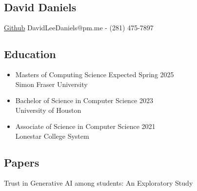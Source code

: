 \documentclass[12pt]{article}
\begin{document}
    \begin{center}
        \section*{David Daniels}
        \cite{github}\href{https://github.com/tetricz}{Github} DavidLeeDaniels@pm.me - (281) 475-7897
    \end{center}

    \subsection*{Education}
    \begin{itemize}[leftmargin=0em]
        \item[] Masters of Computing Science \hfill Expected Spring 2025 \\
        Simon Fraser University
        \item[] Bachelor of Science in Computer Science \hfill 2023 \\
        University of Houston
        \item[] Associate of Science in Computer Science \hfill 2021 \\
        Lonestar College System
    \end{itemize}

    \subsection*{Papers}

    \cite{Amoozadeh_2023} Trust in Generative AI among students: An Exploratory Study
    
\end{document}
